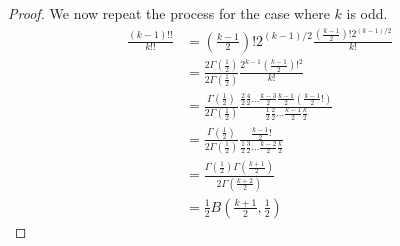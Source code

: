 \documentclass{article}
\begin{document}
\begin{proof}
	We now repeat the process for the case where $k$ is odd.
	\begin{align}
		\frac{(k-1)!!}{k!!} &= \left(\frac{k-1}{2}\right)!2^{(k-1)/2}\frac{(\frac{k-1}{2})!2^{(k-1)/2}}{k!} \\
		&= \frac{2\Gamma(\frac{1}{2})}{2\Gamma(\frac{1}{2})}\frac{2^{k-1}(\frac{k-1}{2})!^2}{k!} \\
		&= \frac{\Gamma(\frac{1}{2})}{2\Gamma(\frac{1}{2})}\frac{\frac{2}{2}\frac{4}{2}\hdots\frac{k-3}{2}\frac{k-1}{2}(\frac{k-1}{2}!)}{\frac{1}{2}\frac{2}{2}\hdots\frac{k-1}{2}\frac{k}{2}} \\
		&= \frac{\Gamma(\frac{1}{2})}{2\Gamma(\frac{1}{2})}\frac{\frac{k-1}{2}!}{\frac{1}{2}\frac{3}{2}\hdots\frac{k-2}{2}\frac{k}{2}} \\
		&= \frac{\Gamma(\frac{1}{2})\Gamma(\frac{k+1}{2})}{2\Gamma(\frac{k+2}{2})} \\
		&= \frac{1}{2}B\left(\frac{k+1}{2}, \frac{1}{2}\right)
	\end{align}
\end{proof}
\end{document}
